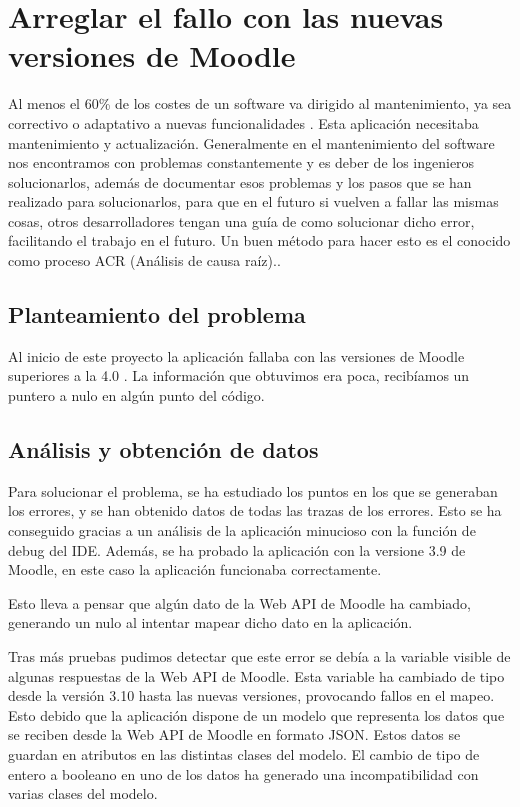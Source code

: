 
\section{Arreglar el fallo con las nuevas versiones de Moodle}
Al menos el 60\% de los costes de un software va dirigido al mantenimiento, ya sea correctivo o adaptativo a nuevas funcionalidades \cite{costos-mantenimiento}. Esta aplicación necesitaba mantenimiento y actualización. Generalmente en el mantenimiento del software nos encontramos con problemas constantemente y es deber de los ingenieros solucionarlos, además de documentar esos problemas y los pasos que se han realizado para solucionarlos, para que en el futuro si vuelven a fallar las mismas cosas, otros desarrolladores tengan una guía de como solucionar dicho error, facilitando el trabajo en el futuro. Un buen método para hacer esto es el conocido como proceso ACR (Análisis de causa raíz).\cite{proceso-acr}.

\subsection{Planteamiento del problema}
Al inicio de este proyecto la aplicación fallaba con las versiones de Moodle superiores a la 4.0 . La información que obtuvimos era poca, recibíamos un puntero a nulo en algún punto del código.
\subsection{Análisis y obtención de datos}
Para solucionar el problema, se ha estudiado los puntos en los que se generaban los errores, y se han obtenido datos de todas las trazas de los errores. Esto se ha conseguido gracias a un análisis de la aplicación minucioso con la función de debug del IDE.
Además, se ha probado la aplicación con la versione 3.9 de Moodle, en este caso la aplicación funcionaba correctamente.

Esto lleva a pensar que algún dato de la Web API de Moodle ha cambiado, generando un nulo al intentar mapear dicho dato en la aplicación.

Tras más pruebas pudimos detectar que este error se debía a la variable visible de algunas respuestas de la Web API de Moodle. Esta variable ha cambiado de tipo desde la versión 3.10 hasta las nuevas versiones, provocando fallos en el mapeo. Esto debido que la aplicación dispone de un modelo que representa los datos que se reciben desde la Web API de Moodle en formato JSON. Estos datos se guardan en atributos en las distintas clases del modelo. El cambio de tipo de entero a booleano en uno de los datos ha generado una incompatibilidad con varias clases del modelo. 

